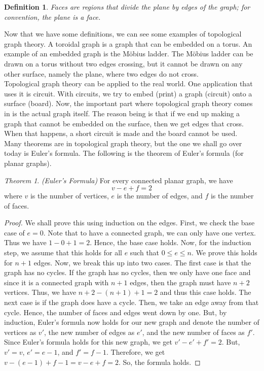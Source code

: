 \documentclass[12pt]{article}
\newtheorem{mydef}{Definition}
\newcommand{\tab}{\hspace{10mm}}
\theoremstyle{definition}
\theoremstyle{remark}
\newtheorem{theorem}{Theorem}
\begin{document}
\begin{mydef}
Faces are regions that divide the plane by edges of the graph; for convention, the plane is a face.
\end{mydef}



\tab Now that we have some definitions, we can see some examples of topological graph theory.
%
A toroidal graph is a graph that can be embedded on a torus.
%
An example of an embedded graph is the M{\"o}bius ladder.
%
The M{\"o}bius ladder can be drawn on a torus without two edges crossing, but it cannot be drawn on any other surface, namely the plane, where two edges do not cross.\\
%



\tab Topological graph theory can be applied to the real world.
%
One application that uses it is circuit.
%
With circuits, we try to embed (print) a graph (circuit) onto a surface (board).
%
Now, the important part where topological graph theory comes in is the actual graph itself.
%
The reason being is that if we end up making a graph that cannot be embedded on the surface, then we get edges that cross.
%
When that happens, a short circuit is made and the board cannot be used.\\
%



\tab Many theorems are in topological graph theory, but the one we shall go over today is Euler's formula. 
%
The following is the theorem of Euler's formula (for planar graphs).
	
	\begin{theorem}
	\emph{(Euler's Formula)}
	\label{Lagrange}
		For every connected planar graph, we have $$v - e + f = 2$$ where $v$ is the number of vertices, $e$ is the number of edges, and $f$ is the number of faces.
	\end{theorem}

	\begin{proof}
		We shall prove this using induction on the edges. First, we check the base case of $e = 0$.
		Note that to have a connected graph, we can only have one vertex. Thus we have $1 - 0 + 1 = 2$.
		Hence, the base case holds. Now, for the induction step, we assume that this holds for all $e$ such that $0 \leq e \leq n$. We prove this holds for $n + 1$ edges. Now, we break this up into two cases. The first case is that the graph has no cycles. If the graph has no cycles, then we only have one face and since it is a connected graph with $n + 1$ edges, then the graph must have $n + 2$ vertices. Thus, we have
		$n + 2 - (n + 1) + 1 = 2$ and thus this case holds. The next case is if the graph does have a cycle. 
		Then, we take an edge away from that cycle. Hence, the number of faces and edges went down by one. But, by induction, Euler's formula now holds for our new graph and denote the number of vertices as $v'$, the new number of edges as $e'$, and the new number of faces as $f'$. Since Euler's formula holds for this new graph, we get $v' - e' + f' = 2$. But, $v' = v$, $e' = e - 1$, and $f' = f - 1$. Therefore, we get $v - (e - 1) + f - 1 = v - e + f = 2.$ So, the formula holds.
	\end{proof}
\end{document}
